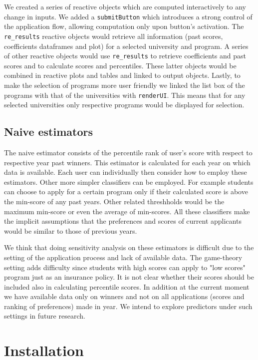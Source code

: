 \documentclass{article}
\begin{document}
We created a series of reactive objects which are computed interactively to any change in inputs. We added a \texttt{submitButton} which introduces a strong control of the application flow, allowing computation only upon button's activation. The \texttt{re\_results} reactive objects would retrieve all information (past scores, coefficients dataframes and plot) for a selected university and program.  A series of other reactive objects would use \texttt{re\_results} to retrieve coefficients and past scores and to calculate scores and percentiles. These latter objects would be combined in reactive plots and tables and linked to output objects. Lastly, to make the selection of programs more user friendly we linked the list box of the programs with that of the universities with \texttt{renderUI}. This means that for any selected universities only respective programs would be displayed for selection. 

\subsection{Naive estimators}

The naive estimator consists of the percentile rank of user's score with respect to respective year past winners. This estimator is calculated for each year on which data is available. Each user can individually then consider how to employ these estimators. Other more simpler classifiers can be employed. For example students can choose to apply for a certain program only if their calculated score is above the min-score of any past years. Other related threshholds would be the maximum min-score or even the average of min-scores. All these classifiers make the implicit assumptions that the preferences and scores of current applicants would be similar to those of previous years. 

We think that doing sensitivity analysis on these estimators is difficult due to the setting of the application process and lack of available data. The game-theory setting adds difficulty since students with high scores can apply to "low scores" program just as an insurance policy. It is not clear whether their scores should be included also in calculating percentile scores. In addition at the current moment we have available data only on winners and not on all applications (scores and ranking of preferences) made in year. We intend to explore predictors under such settings in future research.

\section{Installation}
\end{document}
